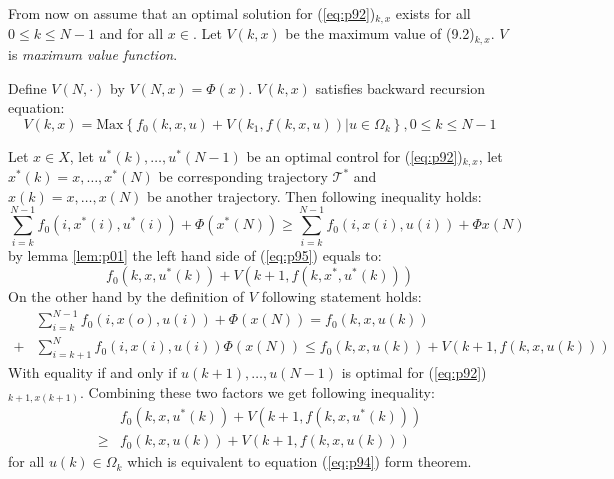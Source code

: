 \noindent From now on assume that an optimal solution for (\ref{eq:p92})$_{k,x}$ exists for all $0 \le k \le N-1$ and for all $x\in$. Let $V(k,x)$ be the maximum value of (9.2)$_{k,x}$. $V$ is \textit{maximum value function}.

\begin{theorem}\label{th:p01}
Define $V(N,\cdot)$ by $V(N,x)=\Phi(x)$. $V(k,x)$ satisfies backward recursion equation:
\begin{equation}\label{eq:p94}
    V(k,x) = \text{Max}\left\{f_0(k,x,u)+V(k_1,f(k,x,u))|u\in\Omega_k\right\}, 0 \le k \le N-1
\end{equation}
\end{theorem}
\begin{dokaz}
Let $x\in X$, let $u^*(k),\dots,u^*(N-1)$ be an optimal control for (\ref{eq:p92})$_{k,x}$, let $x^*(k)=x,\dots,x^*(N)$ be corresponding trajectory $\mathscr{T}^*$ and $x(k)= x,\dots,x(N)$ be another trajectory. Then following inequality holds:
\begin{equation}\label{eq:p95}
    \sum_{i=k}^{N-1} f_0(i,x^*(i),u^*(i)) + \Phi(x^*(N)) \ge \sum_{i=k}^{N-1} f_0(i, x(i), u(i)) + \Phi{x(N)}
\end{equation}
\noindent by lemma \ref{lem:p01} the left hand side of (\ref{eq:p95}) equals to:
\begin{equation}
    f_0(k,x,u^*(k)) + V(k+1,f(k,x^*,u^*(k)))
\end{equation}
\noindent On the other hand by the definition of $V$ following statement holds:
\begin{equation}
    \begin{split}
    &\sum_{i=k}^{N-1} f_0(i,x(o),u(i)) + \Phi(x(N)) =  f_0(k,x,u(k))\\
    +& \sum_{i=k+1}^{N} f_0(i,x(i),u(i)) \Phi(x(N)) \le f_0(k,x,u(k)) + V(k+1,f(k,x,u(k)))
    \end{split}
\end{equation}
\noindent With equality if and only if $u(k+1),\dots,u(N-1)$ is optimal for (\ref{eq:p92})$_{k+1,x(k+1)}$. Combining these two factors we get following inequality:
\begin{equation}
    \begin{split}
    &f_0(k,x,u^*(k)) + V(k+1,f(k,x,u^*(k)))\\
    \ge & f_0(k,x,u(k)) + V(k+1,f(k,x,u(k)))
    \end{split}
\end{equation}
\noindent for all $u(k)\in\Omega_k$ which is equivalent to equation (\ref{eq:p94}) form theorem.
\end{dokaz}

